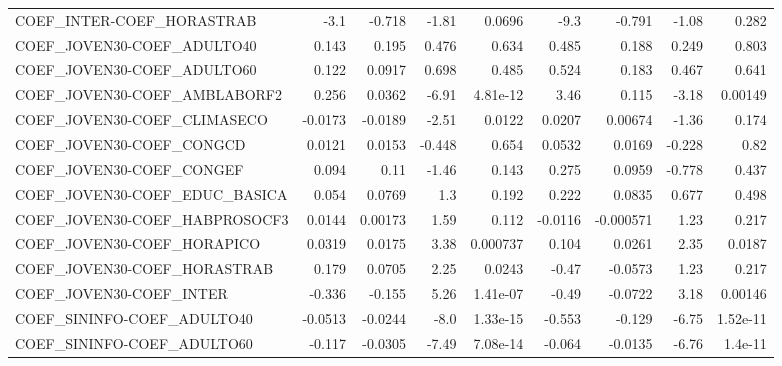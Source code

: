 \begin{tabular}{lrrrrrrrr}
COEF\_INTER-COEF\_HORASTRAB              &        -3.1 &       -0.718 &   -1.81 &   0.0696 &       -9.3 &      -0.791 &        -1.08 &         0.282 \\
COEF\_JOVEN30-COEF\_ADULTO40             &       0.143 &        0.195 &   0.476 &    0.634 &      0.485 &       0.188 &        0.249 &         0.803 \\
COEF\_JOVEN30-COEF\_ADULTO60             &       0.122 &       0.0917 &   0.698 &    0.485 &      0.524 &       0.183 &        0.467 &         0.641 \\
COEF\_JOVEN30-COEF\_AMBLABORF2           &       0.256 &       0.0362 &   -6.91 & 4.81e-12 &       3.46 &       0.115 &        -3.18 &       0.00149 \\
COEF\_JOVEN30-COEF\_CLIMASECO            &     -0.0173 &      -0.0189 &   -2.51 &   0.0122 &     0.0207 &     0.00674 &        -1.36 &         0.174 \\
COEF\_JOVEN30-COEF\_CONGCD               &      0.0121 &       0.0153 &  -0.448 &    0.654 &     0.0532 &      0.0169 &       -0.228 &          0.82 \\
COEF\_JOVEN30-COEF\_CONGEF               &       0.094 &         0.11 &   -1.46 &    0.143 &      0.275 &      0.0959 &       -0.778 &         0.437 \\
COEF\_JOVEN30-COEF\_EDUC\_BASICA          &       0.054 &       0.0769 &     1.3 &    0.192 &      0.222 &      0.0835 &        0.677 &         0.498 \\
COEF\_JOVEN30-COEF\_HABPROSOCF3          &      0.0144 &      0.00173 &    1.59 &    0.112 &    -0.0116 &   -0.000571 &         1.23 &         0.217 \\
COEF\_JOVEN30-COEF\_HORAPICO             &      0.0319 &       0.0175 &    3.38 & 0.000737 &      0.104 &      0.0261 &         2.35 &        0.0187 \\
COEF\_JOVEN30-COEF\_HORASTRAB            &       0.179 &       0.0705 &    2.25 &   0.0243 &      -0.47 &     -0.0573 &         1.23 &         0.217 \\
COEF\_JOVEN30-COEF\_INTER                &      -0.336 &       -0.155 &    5.26 & 1.41e-07 &      -0.49 &     -0.0722 &         3.18 &       0.00146 \\
COEF\_SININFO-COEF\_ADULTO40             &     -0.0513 &      -0.0244 &    -8.0 & 1.33e-15 &     -0.553 &      -0.129 &        -6.75 &      1.52e-11 \\
COEF\_SININFO-COEF\_ADULTO60             &      -0.117 &      -0.0305 &   -7.49 & 7.08e-14 &     -0.064 &     -0.0135 &        -6.76 &       1.4e-11 \\

\end{tabular}
